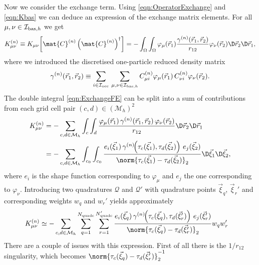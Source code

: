 Now we consider the exchange term.
Using \eqref{eqn:OperatorExchange} and \eqref{eqn:Kbas} we can
deduce an expression of the exchange matrix elements.
For all $\mu, \nu \in \mathcal{I}_{\text{bas},h}$ we get
\begin{equation}
	\label{eqn:ExchangeFE}
	K^{(n)}_{\mu\nu} \equiv
	K_{\mu\nu}\!\left[\mat{C}^{(n)} \left(\mat{C}^{(n)}\right)^\dagger\right]
	= -\int_\Omega \int_\Omega
		\varphi_\mu(\vec{r}_1) \frac{\gamma^{(n)}(\vec{r}_1, \vec{r}_2)}
		{ r_{12} }\varphi_\nu(\vec{r}_2) \D \vec{r}_2 \D \vec{r}_1,
\end{equation}
where we introduced the discretised one-particle reduced density matrix
\begin{equation}
	\gamma^{(n)}(\vec{r}_1, \vec{r}_2)
	\equiv \sum_{i\in\mathcal{I}_\text{occ}} \, \sum_{\mu,\nu\in\mathcal{I}_{\text{bas},h}}
	C^{(n)}_{\mu i} \varphi_\mu(\vec{r}_1) \, C^{(n)}_{\nu i} \varphi_\nu(\vec{r}_2).
	\label{eqn:DensityMatrixFE}
\end{equation}
The double integral \eqref{eqn:ExchangeFE}
can be split into a sum of contributions from each grid cell pair
$(c,d) \in \left( \mathcal{M}_h \right)^2$
\begin{align*}
	K^{(n)}_{\mu\nu}
	&= -\sum_{c,d \in \mathcal{M}_h}
		\int_{c} \int_{d}
		\frac{\varphi_\mu(\vec{r}_1) \, \gamma^{(n)}(\vec{r}_1, \vec{r}_2)
			\,\varphi_\nu(\vec{r}_2)}
		{r_{12}} \D \vec{r}_2 \D \vec{r}_1 \\
	&= -\sum_{c,d \in \mathcal{M}_h}
		\int_{c_0} \int_{c_0}
		\frac{e_i(\vec{\xi}_1)\,
			\gamma^{(n)}\!\!\left(\tau_c(\vec{\xi}_1), \tau_d(\vec{\xi}_2)\right)
			\,e_j(\vec{\xi}_2)}
		{\norm{\tau_c(\vec{\xi}_1) - \tau_d(\vec{\xi}_2)}_2}
		\D \vec{\xi}_1 \D \vec{\xi}_2,
\end{align*}
where $e_i$ is the shape function corresponding to $\varphi_\mu$
and $e_j$ the one corresponding to $\varphi_\nu$.
Introducing two quadratures $\mathcal{Q}$ and $\mathcal{Q}'$
with quadrature points $\vec{\xi}_q$, $\vec{\xi}_r'$
and corresponding weights $w_q$ and $w_r'$ yields approximately
\begin{align*}
	K^{(n)}_{\mu\nu}
		&\simeq -\sum_{c,d \in \mathcal{M}_h}
		\sum_{q=1}^{\Nquadc}
		\sum_{r=1}^{\Nquadc'}
		\frac{
			e_i(\vec{\xi}_q) \,
			\gamma^{(n)}\!\!\left(\tau_c(\vec{\xi}_q), \tau_d(\vec{\xi}'_r)\right)
			\,e_j(\vec{\xi}'_r)}
		{\norm{\tau_c(\vec{\xi}_q) - \tau_d(\vec{\xi}'_r)}_2}
		w_q w_r'
\end{align*}
There are a couple of issues with this expression.
First of all there is the $1/r_{12}$ singularity,
which becomes $\norm{\tau_c(\vec{\xi}_q) - \tau_d(\vec{\xi}'_r)}_2^{-1}$
